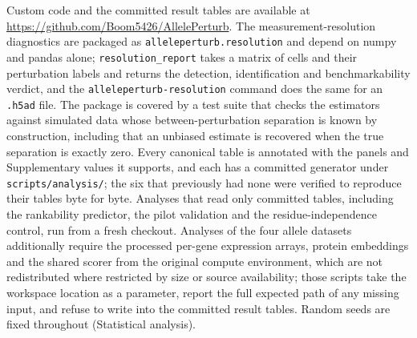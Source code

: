 \documentclass[11pt,letterpaper]{article}
\begin{document}
Custom code and the committed result tables are available at \url{https://github.com/Boom5426/AllelePerturb}. The measurement-resolution diagnostics are packaged as \texttt{alleleperturb.resolution} and depend on numpy and pandas alone; \texttt{resolution\_report} takes a matrix of cells and their perturbation labels and returns the detection, identification and benchmarkability verdict, and the \texttt{alleleperturb-resolution} command does the same for an \texttt{.h5ad} file. The package is covered by a test suite that checks the estimators against simulated data whose between-perturbation separation is known by construction, including that an unbiased estimate is recovered when the true separation is exactly zero. Every canonical table is annotated with the panels and Supplementary values it supports, and each has a committed generator under \texttt{scripts/analysis/}; the six that previously had none were verified to reproduce their tables byte for byte. Analyses that read only committed tables, including the rankability predictor, the pilot validation and the residue-independence control, run from a fresh checkout. Analyses of the four allele datasets additionally require the processed per-gene expression arrays, protein embeddings and the shared scorer from the original compute environment, which are not redistributed where restricted by size or source availability; those scripts take the workspace location as a parameter, report the full expected path of any missing input, and refuse to write into the committed result tables. Random seeds are fixed throughout (Statistical analysis).



\end{document}
